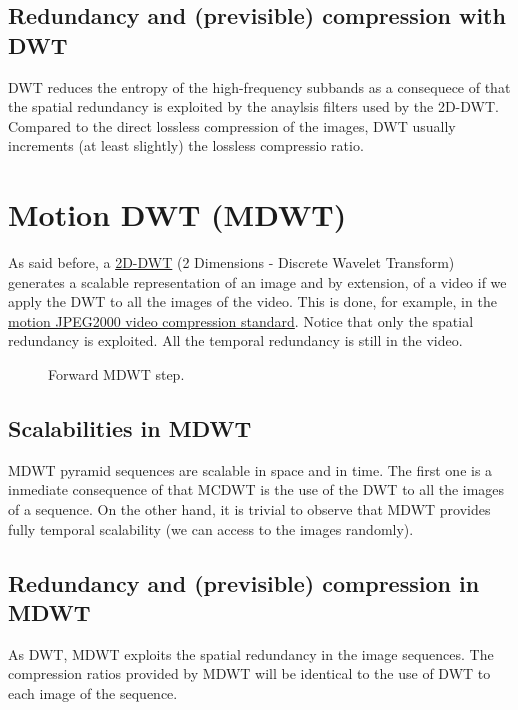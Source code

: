 \subsection{Redundancy and (previsible) compression with DWT}
DWT reduces the entropy of the high-frequency subbands as a consequece
of that the spatial redundancy is exploited by the anaylsis filters
used by the 2D-DWT. Compared to the direct lossless compression of the
images, DWT usually increments (at least slightly) the lossless
compressio ratio.

\section{Motion DWT (MDWT)}
As said before, a
\href{https://en.wikipedia.org/wiki/Discrete_wavelet_transform}{2D-DWT}
(2 Dimensions - Discrete Wavelet Transform) generates a scalable
representation of an image and by extension, of a video if we apply the
DWT to all the images of the video. This is done, for example, in the
\href{https://en.wikipedia.org/wiki/JPEG_2000}{motion JPEG2000 video
compression standard}. Notice that only the spatial redundancy is
exploited. All the temporal redundancy is still in the video.

\begin{figure}
\centering
{}
\caption{Forward MDWT step.}
\end{figure}


\subsection{Scalabilities in MDWT}
MDWT pyramid sequences are scalable in space and in time. The first
one is a inmediate consequence of that MCDWT is the use of the DWT to
all the images of a sequence. On the other hand, it is trivial to
observe that MDWT provides fully temporal scalability (we can access
to the images randomly).

\subsection{Redundancy and (previsible) compression in MDWT}
As DWT, MDWT exploits the spatial redundancy in the image
sequences. The compression ratios provided by MDWT will be identical
to the use of DWT to each image of the sequence.

